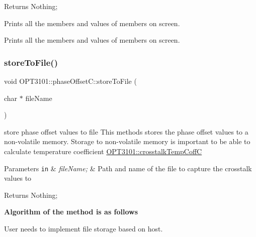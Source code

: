 \begin{DoxyReturn}{Returns}
Nothing; 
\end{DoxyReturn}

\begin{DoxyItemize}
\item Prints all the members and values of members on screen. ~\newline

\item Prints all the members and values of members on screen. 
\end{DoxyItemize}\mbox{\label{class_o_p_t3101_1_1phase_offset_c_ae542e328ed54d6e791c1350d878d1dd0}} 
\subsubsection{\texorpdfstring{store\+To\+File()}{storeToFile()}}
{\footnotesize\ttfamily void O\+P\+T3101\+::phase\+Offset\+C\+::store\+To\+File (\begin{DoxyParamCaption}\item[{char $\ast$}]{file\+Name }\end{DoxyParamCaption})}



store phase offset values to file This methods stores the phase offset values to a non-\/volatile memory. Storage to non-\/volatile memory is important to be able to calculate temperature coefficient \mbox{\hyperlink{class_o_p_t3101_1_1crosstalk_temp_coff_c}{O\+P\+T3101\+::crosstalk\+Temp\+CoffC}} 


\begin{DoxyParams}[1]{Parameters}
\mbox{\tt in}  & {\em file\+Name;} & Path and name of the file to capture the crosstalk values to \\
\hline
\end{DoxyParams}
\begin{DoxyReturn}{Returns}
Nothing; 
\end{DoxyReturn}
{\bfseries Algorithm of the method is as follows}


\begin{DoxyItemize}
\item User needs to implement file storage based on host. 
\end{DoxyItemize}

